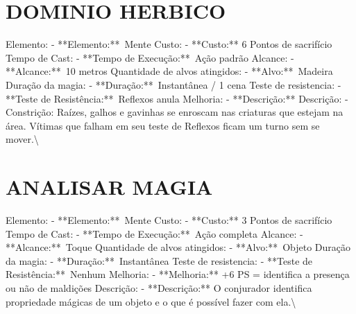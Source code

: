 \documentclass{article}%
\begin{document}
\section{DOMINIO HERBICO}%
\label{sec:DOMINIOHERBICO}%
Elemento: {-} **Elemento:**~Mente\newline%
Custo: {-} **Custo:** 6 Pontos de sacrifício\newline%
Tempo de Cast: {-} **Tempo de Execução:**~Ação padrão\newline%
Alcance: {-} **Alcance:**~10 metros\newline%
Quantidade de alvos atingidos: {-} **Alvo:**~Madeira\newline%
Duração da magia: {-} **Duração:**~Instantânea / 1 cena\newline%
Teste de resistencia: {-} **Teste de Resistência:**~Reflexos anula\newline%
Melhoria: {-} **Descrição:**\newline%
Descrição:   {-} Constrição: Raízes, galhos e gavinhas se enroscam nas criaturas que estejam na área. Vítimas que falham em seu teste de Reflexos ficam um turno sem se mover.\textbackslash{}

%
\section{ANALISAR MAGIA}%
\label{sec:ANALISARMAGIA}%
Elemento: {-} **Elemento:**~Mente\newline%
Custo: {-} **Custo:** 3 Pontos de sacrifício\newline%
Tempo de Cast: {-} **Tempo de Execução:**~Ação completa\newline%
Alcance: {-} **Alcance:**~Toque\newline%
Quantidade de alvos atingidos: {-} **Alvo:**~Objeto\newline%
Duração da magia: {-} **Duração:**~Instantânea\newline%
Teste de resistencia: {-} **Teste de Resistência:**~Nenhum\newline%
Melhoria: {-} **Melhoria:** +6 PS = identifica a presença ou não de maldições\newline%
Descrição: {-} **Descrição:** O conjurador identifica propriedade mágicas de um objeto e o que é possível fazer com ela.\textbackslash{}

%
\end{document}

